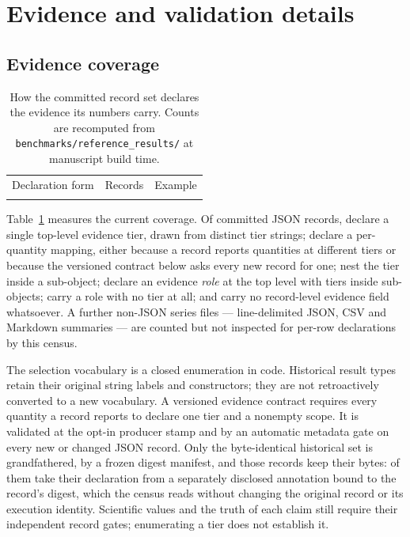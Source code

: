 \documentclass[aps,pra,reprint,superscriptaddress,nofootinbib,floatfix,
  showkeys]{revtex4-2}
\begin{document}
\appendix
\section{Evidence and validation details}
\label{app:evidence}

\subsection{Evidence coverage}

\begin{table}
  \caption{How the committed record set declares the evidence its numbers
  carry.  Counts are recomputed from
  \texttt{benchmarks/reference\_results/} at manuscript build time.}
  \label{tab:evidence}
  \scriptsize
  \begin{ruledtabular}
  \begin{tabular}{@{}lrl@{}}
  Declaration form & Records & Example \\
  \colrule
  
  \end{tabular}
  \end{ruledtabular}
\end{table}

Table~\ref{tab:evidence} measures the current coverage. Of \cqcJsonRecords{} committed JSON records,
\cqcRecordsLabelled{} declare a single top-level evidence tier, drawn from
\cqcDistinctTiers{} distinct tier strings; \cqcRecordsPerQuantity{} declare a
per-quantity mapping, either because a record reports quantities at different
tiers or because the versioned contract below asks every new record for one;
\cqcRecordsNested{} nest the tier inside a
sub-object; \cqcRecordsRoleWithNested{} declare an evidence \emph{role} at the
top level with tiers inside sub-objects; \cqcRecordsRoleOnly{} carry a role with
no tier at all; and \cqcRecordsUnlabelled{} carry no record-level evidence field
whatsoever.  A further \cqcSeriesFiles{} non-JSON series files --- line-delimited
JSON, CSV and Markdown summaries --- are counted but not inspected for per-row
declarations by this census.

The selection vocabulary is a closed enumeration in code. Historical result
types retain their original string labels and constructors; they are not
retroactively converted to a new vocabulary. A versioned evidence contract
requires every quantity a record reports to declare one tier and a nonempty
scope. It is validated at the opt-in producer stamp and by an automatic metadata
gate on every new or changed JSON record. Only the byte-identical historical set
is grandfathered, by a frozen digest manifest, and those records keep their
bytes: \cqcRecordsAnnotated{} of them take their declaration from a separately
disclosed annotation bound to the record's digest, which the census reads
without changing the original record or its execution identity. Scientific
values and the truth of each claim still require their independent record
gates; enumerating a tier does not establish it.
\end{document}
